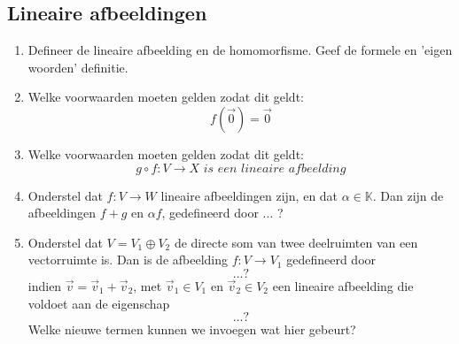 \documentclass[12pt]{article}
\begin{document}
    \subsection{Lineaire afbeeldingen}
    \begin{enumerate}
        \item Defineer de lineaire afbeelding en de homomorfisme. Geef de formele en 'eigen woorden' definitie.
        \item Welke voorwaarden moeten gelden zodat dit geldt: $$f(\vec{0})=\vec{0}$$
        \item Welke voorwaarden moeten gelden zodat dit geldt: $$g \circ f: V \rightarrow X \,\, is \,\, een \,\, lineaire \,\, afbeelding$$
        \item Onderstel dat $f: V \rightarrow W$ lineaire afbeeldingen zijn, en dat $\alpha \in \mathbb{K}$. Dan zijn de afbeeldingen $f+g$ en $\alpha f$, gedefineerd door ... ?
        \item Onderstel dat $V=V_1 \oplus V_2$ de directe som van twee deelruimten van een vectorruimte is. Dan is de afbeelding $f:V \rightarrow V_1$ gedefineerd door $$...?$$ indien $\vec{v}=\vec{v}_1 + \vec{v}_2$, met $\vec{v}_1 \in V_1$ en $\vec{v}_2 \in V_2$ een lineaire afbeelding die voldoet aan de eigenschap $$...?$$ Welke nieuwe termen kunnen we invoegen wat hier gebeurt?
    \end{enumerate}
\end{document}

